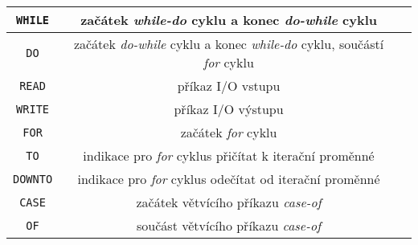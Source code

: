 \documentclass[
12pt,
a4paper,
pdftex,
czech
]{report}
\begin{document}
\begin{longtable}{|c|c|p{10cm}|}
\texttt{WHILE} & začátek \textit{while-do} cyklu a konec \textit{do-while} cyklu \\ \hline
\texttt{DO} & začátek \textit{do-while} cyklu a konec \textit{while-do} cyklu, součástí \textit{for} cyklu \\ \hline
\texttt{READ} & příkaz I/O vstupu \\ \hline
\texttt{WRITE} & příkaz I/O výstupu \\ \hline
\texttt{FOR} & začátek \textit{for} cyklu \\ \hline
\texttt{TO} & indikace pro \textit{for} cyklus přičítat k iterační proměnné \\ \hline
\texttt{DOWNTO} & indikace pro \textit{for} cyklus odečítat od iterační proměnné \\ \hline
\texttt{CASE} & začátek větvícího příkazu \textit{case-of} \\ \hline
\texttt{OF} & součást větvícího příkazu \textit{case-of} \\ \hline
\end{longtable}
\end{document}
